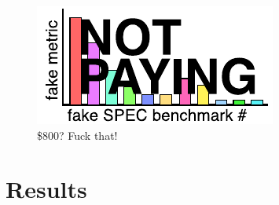\documentclass[twocolumn]{article}
\begin{document}
\begin{figure}[ht]
\begin{center}
\includegraphics[width=0.99 \linewidth]{spec.pdf}
\end{center}\vspace{-0.1in}
\caption{\$800? Fuck that!}
\label{fig:spec}
\end{figure}



\section{Results}


{}

\end{document}
